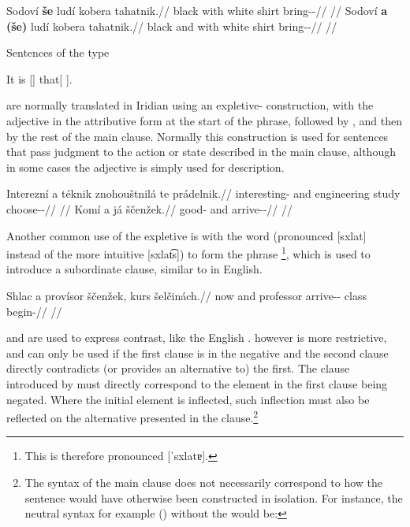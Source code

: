 \pex
\a
\begingl
    \gla Sodoví \textbf{še} ludí kobera tahatnik.//
    \glb black with white shirt bring-\Pv{}-\Pf{}//
    \glft {}//
\endgl
\a
\begingl
    \gla Sodoví \textbf{a} \textbf{(še)} ludí kobera tahatnik.//
    \glb black and with white shirt bring-\Pv{}-\Pf{}//
    \glft {}//
\endgl
\xe

Sentences of the type

\ex
It is [] that[ ].
\xe

are normally translated in Iridian using an expletive- construction, with the adjective in the attributive form at the start of the phrase, followed by , and then by the rest of the main clause. Normally this construction is used for sentences that pass judgment to the action or state described in the main clause, although in some cases the adjective is simply used for description.

\pex
\begingl
    \gla Interezní a téknik znohouštnilá te prádelnik.//
    \glb interesting-\Att{} and engineering study  choose-\Pv{}-\Pf{}//
    \glft {}//
\endgl
\xe
\pex
\begingl
    \gla Komí a já ščenžek.//
    \glb good-\Att{} and  arrive-\Av{}-\Pf{}//
    \glft {}//
\endgl
\xe

Another common use of the expletive  is with the word  (pronounced [sxlat] instead of the more intuitive [sxlat͡s]) to form the phrase \footnote{This is therefore pronounced [ˈsxlatɐ].}, which is used to introduce a subordinate clause, similar to  in English.

\pex
\begingl
    \gla Shlac a provísor ščenžek, kurs šelčinách.//
    \glb now and professor arrive-\Av{}-\Pf{} class begin-//
    \glft {}//
\endgl
\xe


 and  are used to express contrast, like the English .  however is more restrictive, and can only be used if the first clause is in the negative and the second clause directly contradicts (or provides an alternative to) the first. The clause introduced by  must directly correspond to the element in the first clause being negated. Where the initial element is inflected, such inflection must also be reflected on the alternative presented in the  clause.\footnote{The syntax of the main clause does not necessarily correspond to how the sentence would have otherwise been constructed in isolation. For instance, the neutral syntax for example () without the  would be: }

